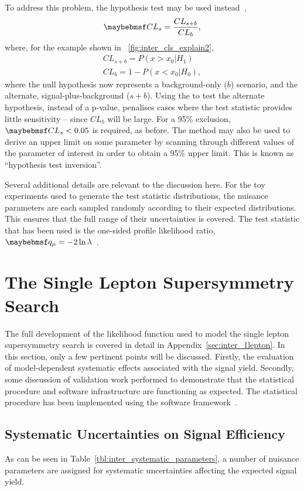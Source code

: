 To address this problem, the \CLs hypothesis test may be used instead~\cite{cls},
\begin{equation*}
\CLs = \frac{CL_{s+b}}{CL_{b}},
\end{equation*}
where, for the example shown in \fig~\ref{fig:inter_cls_explain2},
\begin{eqnarray*}
CL_{s+b} = P\left(x > x_0 | H_1\right)\\
CL_b = 1 - P\left(x < x_0 | H_0\right),
\end{eqnarray*}
where the null hypothesis now represents a background-only ($b$) scenario, and
the alternate, signal-plus-background ($s+b$). Using the \CLs to test the
alternate hypothesis, instead of a p-value, penalises cases where the test
statistic provides little sensitivity -- since $CL_b$ will be large. For a 95\%
exclusion, $\CLs < 0.05$ is required, as before. The \CLs method may also be
used to derive an upper limit on some parameter by scanning through different
values of the parameter of interest in order to obtain a 95\% upper limit. This
is known as ``hypothesis test inversion''.

Several additional details are relevant to the discussion here. For the toy
experiments used to generate the test statistic distributions, the nuisance
parameters are each sampled randomly according to their expected
distributions. This ensures that the full range of their uncertainties is
covered. The test statistic that has been used is the one-sided profile
likelihood ratio, $\qmu=-2\ln\lambda$~\cite{cl_computation,
  modified_frequentist, atlas_cms_higgs}.

\section{The Single Lepton Supersymmetry Search}
The full development of the likelihood function used to model the single lepton
supersymmetry search is covered in detail in
Appendix~\ref{sec:inter_1lepton}. In this section, only a few pertinent points
will be discussed. Firstly, the evaluation of model-dependent systematic effects
associated with the signal yield. Secondly, some discussion of validation work
performed to demonstrate that the statistical procedure and software
infrastructure are functioning as expected. The statistical procedure has been
implemented using the \roostats software framework~\cite{roostats, roostats_web}.

\subsection{Systematic Uncertainties on Signal Efficiency}
As can be seen in Table~\ref{tbl:inter_systematic_parameters}, a number of
nuisance parameters are assigned for systematic uncertainties affecting the
expected signal yield.

